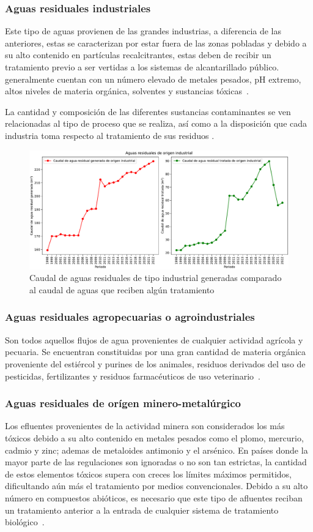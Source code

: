 \subsubsection*{Aguas residuales industriales}
Este tipo de aguas provienen de las grandes industrias, a diferencia de las anteriores, estas se caracterizan por estar fuera de las zonas pobladas y debido a su alto contenido en partículas recalcitrantes, estas deben de recibir un tratamiento previo a ser vertidas a los sistemas de alcantarillado público. generalmente cuentan con un número elevado de metales pesados, pH extremo, altos niveles de materia orgánica, solventes y sustancias tóxicas~\citep{lazcano2016}.\par
La cantidad y composición de las diferentes sustancias contaminantes se ven relacionadas al tipo de proceso que se realiza, así como a la disposición que cada industria toma respecto al tratamiento de sus residuos \citep{Hanchang2009}.
\begin{figure}[H]
	\centering
	\includegraphics[scale=0.45]{../Images/AR_industrial.pdf}
	\caption{Caudal de aguas residuales de tipo industrial generadas comparado al caudal de aguas que reciben algún tratamiento}
\end{figure}
\subsubsection*{Aguas residuales agropecuarias o agroindustriales}
Son todos aquellos flujos de agua provenientes de cualquier actividad agrícola y pecuaria. Se encuentran constituidas por una gran cantidad de materia orgánica proveniente del estiércol y purines de los animales, residuos derivados del uso de pesticidas, fertilizantes y residuos farmacéuticos de uso veterinario~\citep{lazcano2016}.
\subsubsection*{Aguas residuales de orígen minero-metalúrgico}
Los efluentes provenientes de la actividad minera son considerados los más tóxicos debido a su alto contenido en metales pesados como el plomo, mercurio, cadmio y zinc; ademas de metaloides antimonio y el arsénico. En países donde la mayor parte de las regulaciones son ignoradas o no son tan estrictas, la cantidad de estos elementos tóxicos supera con creces los límites máximos permitidos, dificultando aún más el tratamiento por medios convencionales. Debido a su alto número en compuestos abióticos, es necesario que este tipo de afluentes reciban un tratamiento anterior a la entrada de cualquier sistema de tratamiento biológico~\citep{lazcano2016}.
